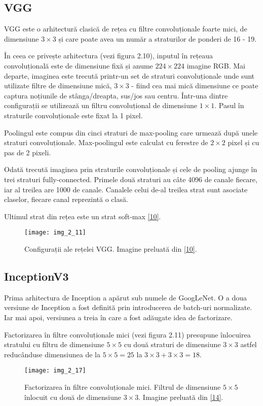 \subsection{VGG}

VGG este o arhitectură clasică de rețea cu filtre convoluționale foarte mici, de dimensiune $3 \times 3$ și care poate avea un număr a straturilor de ponderi de 16 - 19. 

În ceea ce privește arhitectura (vezi figura 2.10), inputul în rețeaua convoluțională este de dimensiune fixă și anume $224 \times 224$ imagine RGB. Mai departe, imaginea este trecută printr-un set de straturi convoluționale unde sunt utilizate filtre de dimensiune mică, $3 \times 3$ - fiind cea mai mică dimensiune ce poate captura noțiunile de stânga/dreapta, sus/jos sau centru. Într-una dintre configurații se utilizează un filtru convoluțional de dimensiune $1 \times 1$. Pasul în straturile convoluționale este fixat la 1 pixel.

Poolingul este compus din cinci straturi de max-pooling care urmează după unele straturi convoluționale. Max-poolingul este calculat cu ferestre de $2\times2$ pixel și cu pas de 2 pixeli.

Odată trecută imaginea prin straturile convoluționale și cele de pooling ajunge în trei straturi fully-connected. Primele două straturi au câte 4096 de canale fiecare, iar al treilea are 1000 de canale. Canalele celui de-al treilea strat sunt asociate claselor, fiecare canal reprezintă o clasă.

Ultimul strat din rețea este un strat soft-max \hyperlink{SimonyanKarenZissermanAndrew}{[10]}.

\begin{figure}[!h]
	\centering
	\texttt{[image: img\_2\_11]}
	\caption[Configurații VGG]{Configurații ale rețelei VGG. Imagine preluată din \hyperlink{SimonyanKarenZissermanAndrew}{[10]}.}
\end{figure}   

\subsection{InceptionV3}
Prima arhitectura de Inception a apărut sub numele de GoogLeNet. O a doua versiune de Inception a fost definită prin introducerea de batch-uri normalizate. Iar mai apoi, versiunea a treia în care a fost adăugate idea de factorizare.

Factorizarea în filtre convoluționale mici (vezi figura 2.11) presupune înlocuirea stratului cu filtru de dimensiune $5 \times 5$ cu două straturi de dimensiune $3 \times 3$ astfel reducânduse dimensiunea de la $5 \times 5 = 25$ la $3 \times 3 + 3 \times 3 = 18$.
\begin{figure}[!h]
	\centering
	\texttt{[image: img\_2\_17]}
	\caption[Factorizarea în filtre convoluționale mici]{Factorizarea în filtre convoluționale mici. Filtrul de dimensiune $5 \times 5$ înlocuit cu două de dimensiune $3 \times 3$. Imagine preluată din \hyperlink{guideinceptionv3}{[14]}.}
\end{figure}   

